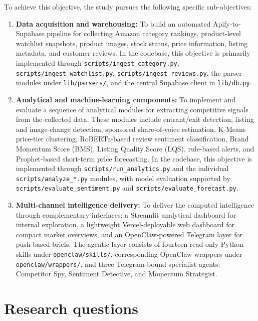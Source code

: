To achieve this objective, the study pursues the following specific
sub-objectives:
\begin{enumerate}
    \item \textbf{Data acquisition and warehousing:} To build an
    automated Apify-to-Supabase pipeline for collecting Amazon category
    rankings, product-level watchlist snapshots, product images, stock
    status, price information, listing metadata, and customer reviews.
    In the codebase, this objective is primarily implemented through
    \texttt{scripts/ingest\_category.py},
    \texttt{scripts/ingest\_watchlist.py},
    \texttt{scripts/ingest\_reviews.py}, the parser modules under
    \texttt{lib/parsers/}, and the central Supabase client in
    \texttt{lib/db.py}.

    \item \textbf{Analytical and machine-learning components:} To
    implement and evaluate a sequence of analytical modules for
    extracting competitive signals from the collected data. These
    modules include entrant/exit detection, listing and image-change
    detection, sponsored share-of-voice estimation, K-Means price-tier
    clustering, RoBERTa-based review sentiment classification, Brand
    Momentum Score (BMS), Listing Quality Score (LQS), rule-based alerts,
    and Prophet-based short-term price forecasting. In the codebase, this
    objective is implemented through \texttt{scripts/run\_analytics.py}
    and the individual \texttt{scripts/analyze\_*.py} modules, with
    model evaluation supported by \texttt{scripts/evaluate\_sentiment.py}
    and \texttt{scripts/evaluate\_forecast.py}.

    \item \textbf{Multi-channel intelligence delivery:} To deliver the
    computed intelligence through complementary interfaces: a Streamlit
    analytical dashboard for internal exploration, a lightweight
    Vercel-deployable web dashboard for compact market overviews, and an
    OpenClaw-powered Telegram layer for push-based briefs. The agentic
    layer consists of fourteen read-only Python skills under
    \texttt{openclaw/skills/}, corresponding OpenClaw wrappers under
    \texttt{openclaw/wrappers/}, and three Telegram-bound specialist
    agents: Competitor Spy, Sentiment Detective, and Momentum Strategist.
\end{enumerate}

\section{Research questions}

